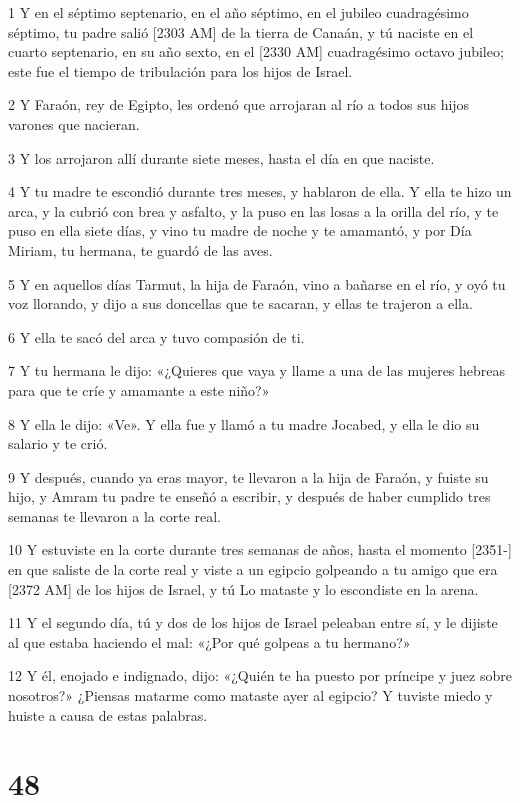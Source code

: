 \par 1 Y en el séptimo septenario, en el año séptimo, en el jubileo cuadragésimo séptimo, tu padre salió [2303 AM] de la tierra de Canaán, y tú naciste en el cuarto septenario, en su año sexto, en el [2330 AM] cuadragésimo octavo jubileo; este fue el tiempo de tribulación para los hijos de Israel.
\par 2 Y Faraón, rey de Egipto, les ordenó que arrojaran al río a todos sus hijos varones que nacieran.
\par 3 Y los arrojaron allí durante siete meses, hasta el día en que naciste.
\par 4 Y tu madre te escondió durante tres meses, y hablaron de ella. Y ella te hizo un arca, y la cubrió con brea y asfalto, y la puso en las losas a la orilla del río, y te puso en ella siete días, y vino tu madre de noche y te amamantó, y por Día Miriam, tu hermana, te guardó de las aves.
\par 5 Y en aquellos días Tarmut, la hija de Faraón, vino a bañarse en el río, y oyó tu voz llorando, y dijo a sus doncellas que te sacaran, y ellas te trajeron a ella.
\par 6 Y ella te sacó del arca y tuvo compasión de ti.
\par 7 Y tu hermana le dijo: «¿Quieres que vaya y llame a una de las mujeres hebreas para que te críe y amamante a este niño?»
\par 8 Y ella le dijo: «Ve». Y ella fue y llamó a tu madre Jocabed, y ella le dio su salario y te crió.
\par 9 Y después, cuando ya eras mayor, te llevaron a la hija de Faraón, y fuiste su hijo, y Amram tu padre te enseñó a escribir, y después de haber cumplido tres semanas te llevaron a la corte real.
\par 10 Y estuviste en la corte durante tres semanas de años, hasta el momento [2351-] en que saliste de la corte real y viste a un egipcio golpeando a tu amigo que era [2372 AM] de los hijos de Israel, y tú Lo mataste y lo escondiste en la arena.
\par 11 Y el segundo día, tú y dos de los hijos de Israel peleaban entre sí, y le dijiste al que estaba haciendo el mal: «¿Por qué golpeas a tu hermano?»
\par 12 Y él, enojado e indignado, dijo: «¿Quién te ha puesto por príncipe y juez sobre nosotros?» ¿Piensas matarme como mataste ayer al egipcio? Y tuviste miedo y huiste a causa de estas palabras.

\chapter{48}


